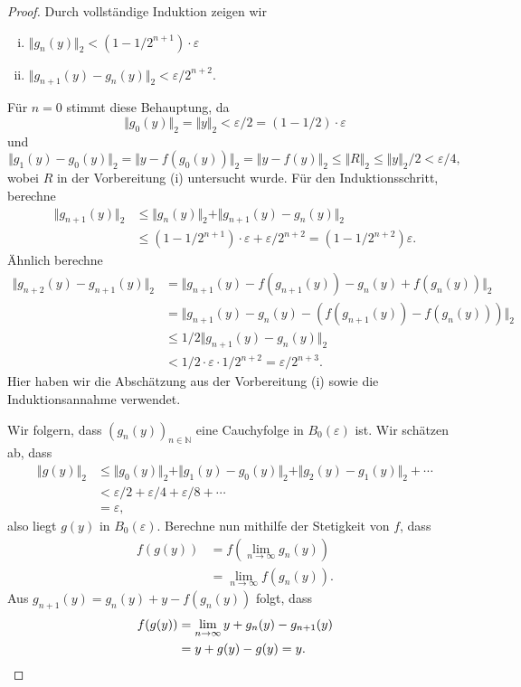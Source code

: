 \documentclass[../main.tex]{subfiles}
\begin{document}
\begin{proof}
  Durch vollständige Induktion zeigen wir
  \begin{enumerate}[(i)]
    \item $\Vert g_n(y) \Vert_2 < (1 - 1/2^{n+1}) \cdot \varepsilon$ 
    \item $\Vert g_{n+1}(y) - g_n(y) \Vert_2 < \varepsilon / 2^{n+2}$.
  \end{enumerate}
  Für $n = 0$ stimmt diese Behauptung, da
  \[
    \Vert g_0(y) \Vert_2 = \Vert y \Vert_2 < \varepsilon / 2 = (1 - 1/2)
    \cdot \varepsilon
  \]
  und
  \[
    \Vert g_1(y) - g_0(y) \Vert_2 = \Vert y - f ( g_0(y)) \Vert_2
    = \Vert y - f(y) \Vert_2 \leq \Vert R \Vert_2
    \leq \Vert y \Vert_2 / 2 < \varepsilon / 4,
  \]
  wobei $R$ in der Vorbereitung (i) untersucht wurde.
  Für den Induktionsschritt, berechne
  \begin{align*}
    \Vert g_{n+1}(y) \Vert_2 
    &\leq  \Vert g_n(y) \Vert_2 + \Vert g_{n+1}(y) - g_n(y) \Vert_2 \\
    &\leq (1 - 1/2^{n+1}) \cdot \varepsilon
    + \varepsilon / 2^{n+2} = (1 - 1/2^{n+2}) \varepsilon.
  \end{align*}
  Ähnlich berechne
  \begin{align*}
    \Vert g_{n+2}(y) - g_{n+1}(y) \Vert_2 
    &= \Vert g_{n+1}(y) - f(g_{n+1}(y)) - g_n(y) + f(g_n(y)) \Vert_2  \\
    &= \Vert g_{n+1}(y) - g_n(y) - (f(g_{n+1}(y)) - f(g_n(y))) \Vert_2 \\
    &\leq 1/2 \Vert g_{n+1}(y) - g_n(y) \Vert_2 \\
    &< 1/2 \cdot \varepsilon \cdot 1/2^{n+2} = \varepsilon/2^{n+3}.
  \end{align*}
  Hier haben wir die Abschätzung aus der Vorbereitung (i)
  sowie die Induktionsannahme verwendet.

  Wir folgern, dass $(g_n(y))_{n \in \mathbb{N}}$ eine Cauchyfolge in
  $B_0(\varepsilon)$ ist.
  Wir schätzen ab, dass
  \begin{align*}
    \Vert g(y) \Vert_2
    & \leq \Vert g_0(y) \Vert_2 +
    \Vert g_1(y) - g_0(y) \Vert_2
    + \Vert g_2(y) - g_1(y) \Vert_2 + \cdots \\
    &< \varepsilon/2 + \varepsilon/4 + \varepsilon/8 + \cdots \\
    &= \varepsilon,
  \end{align*}
  also liegt $g(y)$ in $B_0(\varepsilon)$.
  Berechne nun mithilfe der Stetigkeit von $f$, dass
  \begin{align*}
    f(g(y))
    & = f \left( \lim_{n \to \infty}g_n(y) \right)\\
    &= \lim_{n \to \infty} f(g_n(y)).
  \end{align*}
  Aus $g_{n+1}(y) = g_n(y) + y - f(g_n(y))$ folgt, dass
  \begin{align*}
    f(g(y)) 
    &= \lim_{n \to \infty} y + g_n(y) - g_{n+1}(y)  \\
    &= y + g(y) - g(y) = y. \qedhere
  \end{align*}
\end{proof}
\end{document}
